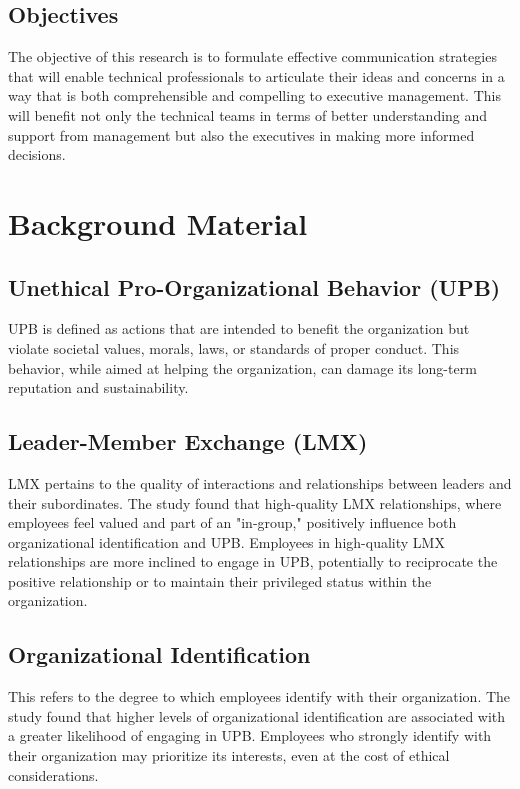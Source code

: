 \documentclass[runningheads]{llncs}
\begin{document}
\subsection{Objectives}
The objective of this research is to formulate effective communication strategies that will enable technical professionals to articulate their ideas and concerns in a way that is both comprehensible and compelling to executive management. This will benefit not only the technical teams in terms of better understanding and support from management but also the executives in making more informed decisions.


\section{Background Material}
\subsection{Unethical Pro-Organizational Behavior (UPB)}
UPB is defined as actions that are intended to benefit the organization but violate societal values, morals, laws, or standards of proper conduct. This behavior, while aimed at helping the organization, can damage its long-term reputation and sustainability. \cite{ref_article01}

\subsection{Leader-Member Exchange (LMX)} LMX pertains to the quality of interactions and relationships between leaders and their subordinates. The study found that high-quality LMX relationships, where employees feel valued and part of an "in-group," positively influence both organizational identification and UPB. Employees in high-quality LMX relationships are more inclined to engage in UPB, potentially to reciprocate the positive relationship or to maintain their privileged status within the organization. \cite{ref_article01}

\subsection{Organizational Identification} This refers to the degree to which employees identify with their organization. The study found that higher levels of organizational identification are associated with a greater likelihood of engaging in UPB. Employees who strongly identify with their organization may prioritize its interests, even at the cost of ethical considerations. \cite{ref_article01}
\end{document}

